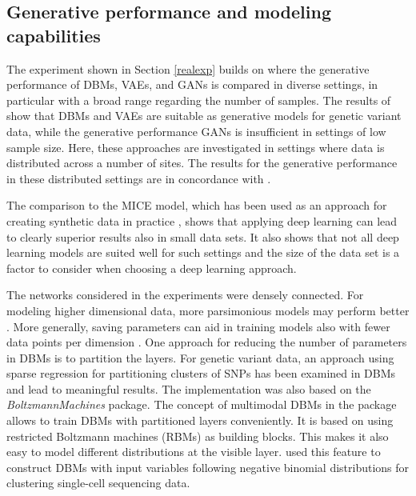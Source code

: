 \documentclass[12pt]{article}
\newcommand{\apkg}[1]{\emph{#1}}
\begin{document}
\subsection{Generative performance and modeling capabilities}
The experiment shown in Section \ref{realexp} builds on \cite{nussberger_synthetic_2020} where the generative performance of DBMs, VAEs, and GANs is compared in diverse settings, in particular with a broad range regarding the number of samples.
The results of \cite{nussberger_synthetic_2020} show that DBMs and VAEs are suitable as generative models for genetic variant data, while the generative performance GANs is insufficient in settings of low sample size.
Here, these approaches are investigated in settings where data is distributed across a number of sites.
The results for the generative performance in these distributed settings are in concordance with \cite{nussberger_synthetic_2020}.

The comparison to the MICE model, which has been used as an approach for creating synthetic data in practice \citep{mice_buuren_2011}, shows that applying deep learning can lead to clearly superior results also in small data sets.
It also shows that not all deep learning models are suited well for such settings and the size of the data set is a factor to consider when choosing a deep learning approach.

The networks considered in the experiments were densely connected. 
For modeling higher dimensional data, more parsimonious models may perform better \citep{nussberger_synthetic_2020}.
More generally, saving parameters can aid in training models also with fewer data points per dimension \citep{chan_classifier_1999}.
One approach for reducing the number of parameters in DBMs is to partition the layers.
For genetic variant data, an approach using sparse regression for partitioning clusters of SNPs has been examined in DBMs \citep{hess2017partitioned} and lead to meaningful results.
The implementation was also based on the \apkg{BoltzmannMachines} package.
The concept of multimodal DBMs in the package allows to train DBMs with partitioned layers conveniently.
It is based on using restricted Boltzmann machines (RBMs) as building blocks.
This makes it also easy to model different distributions at the visible layer.
\cite{treppner_making_2020} used this feature to construct DBMs with input variables following negative binomial distributions for clustering single-cell sequencing data.
\end{document}
